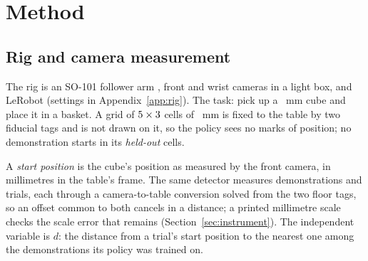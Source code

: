 %
\section{Method}
\label{sec:method}

\subsection{Rig and camera measurement}
The rig is an SO-101 follower arm \cite{therobotstudio2026so100}, front and wrist cameras in a light box, and LeRobot \cite{cadene2024lerobot,cadene2026lerobot} (settings in Appendix~\ref{app:rig}).
The task: pick up a \cubeEdge~mm cube and place it in a basket.
A grid of $5\times3$ cells of \cellSize~mm is fixed to the table by two fiducial tags and is not drawn on it, so the policy sees no marks of position; no demonstration starts in its \nCellsHeldOut \emph{held-out} cells.

A \emph{start position} is the cube's position as measured by the front camera, in millimetres in the table's frame.
The same detector measures demonstrations and trials, each through a camera-to-table conversion solved from the two floor tags, so an offset common to both cancels in a distance; a printed millimetre scale checks the scale error that remains (Section~\ref{sec:instrument}).
The independent variable is $d$: the distance from a trial's start position to the nearest one among the demonstrations its policy was trained on.

